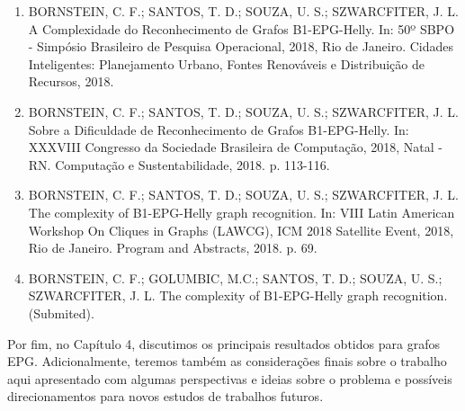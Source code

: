 \begin{enumerate}
    \item BORNSTEIN, C. F.; SANTOS, T. D.; SOUZA, U. S.; SZWARCFITER, J. L. A Complexidade do Reconhecimento de Grafos B1-EPG-Helly. In: 50º SBPO - Simpósio Brasileiro de Pesquisa Operacional, 2018, Rio de Janeiro. Cidades Inteligentes: Planejamento Urbano, Fontes Renováveis e Distribuição de Recursos, 2018.

     \item BORNSTEIN, C. F.; SANTOS, T. D.; SOUZA, U. S.; SZWARCFITER, J. L. Sobre a Dificuldade de Reconhecimento de Grafos B1-EPG-Helly. In: XXXVIII Congresso da Sociedade Brasileira de Computação, 2018, Natal - RN. Computação e Sustentabilidade, 2018. p. 113-116.

     
     \item BORNSTEIN, C. F.; SANTOS, T. D.; SOUZA, U. S.; SZWARCFITER, J. L. The complexity of B1-EPG-Helly graph recognition. In: VIII Latin American Workshop On Cliques in Graphs (LAWCG), ICM 2018 Satellite Event, 2018, Rio de Janeiro. Program and Abstracts, 2018. p. 69.

     
     \item BORNSTEIN, C. F.; GOLUMBIC, M.C.; SANTOS, T. D.; SOUZA, U. S.; SZWARCFITER, J. L.  The complexity of B1-EPG-Helly graph recognition. %
     (Submited).
     
\end{enumerate}


Por fim, no Capítulo 4, discutimos os principais resultados obtidos para grafos EPG. Adicionalmente, teremos
também as considerações finais sobre o trabalho aqui apresentado com algumas perspectivas e ideias sobre o problema e possíveis direcionamentos para novos estudos de trabalhos futuros.